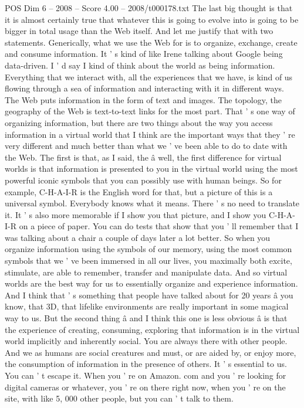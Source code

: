 \begin{textsample}{POS Dim 6 – 2008 – Score 4.00 – 2008/t000178.txt}
The last big thought is that it is almost certainly true that whatever this is going to evolve into is going to be bigger in total usage than the Web itself.
And let me justify that with two statements.
Generically, what we use the Web for is to organize, exchange, create and consume information.
It ' s kind of like Irene talking about Google being data-driven.
I ' d say I kind of think about the world as being information.
Everything that we interact with, all the experiences that we have, is kind of us flowing through a sea of information and interacting with it in different ways.
The Web puts information in the form of text and images.
The topology, the geography of the Web is text-to-text links for the most part.
That ' s one way of organizing information, but there are two things about the way you access information in a virtual world that I think are the important ways that they ' re very different and much better than what we ' ve been able to do to date with the Web.
The first is that, as I said, the â well, the first difference for virtual worlds is that information is presented to you in the virtual world using the most powerful iconic symbols that you can possibly use with human beings.
So for example, C-H-A-I-R is the English word for that, but a picture of this is a universal symbol.
Everybody knows what it means.
There ' s no need to translate it.
It ' s also more memorable if I show you that picture, and I show you C-H-A- I-R on a piece of paper.
You can do tests that show that you ' ll remember that I was talking about a chair a couple of days later a lot better.
So when you organize information using the symbols of our memory, using the most common symbols that we ' ve been immersed in all our lives, you maximally both excite, stimulate, are able to remember, transfer and manipulate data.
And so virtual worlds are the best way for us to essentially organize and experience information.
And I think that ' s something that people have talked about for 20 years â you know, that 3D, that lifelike environments are really important in some magical way to us.
But the second thing â and I think this one is less obvious â is that the experience of creating, consuming, exploring that information is in the virtual world implicitly and inherently social.
You are always there with other people.
And we as humans are social creatures and must, or are aided by, or enjoy more, the consumption of information in the presence of others.
It ' s essential to us.
You can ' t escape it.
When you ' re on Amazon. com and you ' re looking for digital cameras or whatever, you ' re on there right now, when you ' re on the site, with like 5, 000 other people, but you can ' t talk to them.

\end{textsample}
